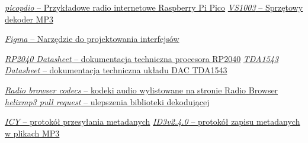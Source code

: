 \documentclass[12pt]{report}
\begin{document}
\begin{thebibliography}{9}
		\href{https://github.com/episource/picopdio}{\textit{picopdio} -- Przykładowe radio internetowe Raspberry Pi Pico}
		\href{https://botland.com.pl/odtwarzacze-mp3-wav-ogg-midi/14308-odtwarzacz-mp3-vs1003-z-mikrofonem-5903351241786.html}{\textit{VS1003} -- Sprzętowy dekoder MP3}
		
		\href{https://www.figma.com}{\textit{Figma} -- Narzędzie do projektowania interfejsów}
		
		\href{https://datasheets.raspberrypi.com/rp2040/rp2040-datasheet.pdf}{\textit{RP2040 Datasheet} -- dokumentacja techniczna procesora RP2040}
		\href{http://www.lampizator.eu/lampizator/LINKS%20AND%20DOWNLOADS/DATAMINING/tda%201543.pdf}{\textit{TDA1543 Datasheet} -- dokumentacja techniczna układu DAC TDA1543}
		
		\href{https://www.radio-browser.info/codecs}{\textit{Radio browser codecs} -- kodeki audio wylistowane na stronie Radio Browser}
		\href{https://github.com/ultraembedded/libhelix-mp3/pull/3}{\textit{helixmp3 pull request} -- ulepszenia biblioteki dekodującej}
		
		\href{https://gist.github.com/niko/2a1d7b2d109ebe7f7ca2f860c3505ef0#file-icy_meta-md}{\textit{ICY} -- protokół przesyłania metadanych}
		\href{https://mutagen-specs.readthedocs.io/en/latest/id3/id3v2.4.0-structure.html}{\textit{ID3v2.4.0} -- protokół zapisu metadanych w plikach MP3}
		
	\end{thebibliography}
	
\end{document}

